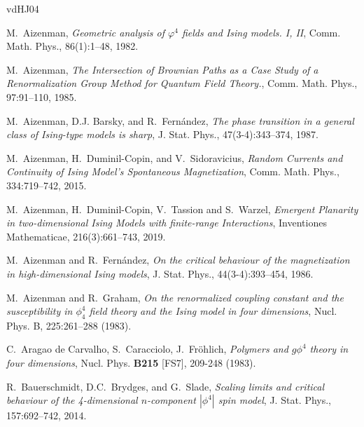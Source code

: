 \documentclass[a4paper,oneside,11pt]{article}
\numberwithin{equation}{section}
\numberwithin{equation}{section}
\numberwithin{equation}{section}
\begin{document}
\providecommand{\bysame}{\leavevmode\hbox to3em{\hrulefill}\thinspace}
\providecommand{\MR}{\relax\ifhmode\unskip\space\fi MR }
\providecommand{\MRhref}[2]{
  \href{http://www.ams.org/mathscinet-getitem?mr=#1}{#2}
}
\providecommand{\href}[2]{#2}
\begin{thebibliography}{vdHJ04}

M.~Aizenman, \emph{Geometric analysis of {$\varphi ^{4}$} fields and {I}sing
  models. {I}, {II}},   Comm. Math. Phys., 86(1):1--48, 1982.
    
  M.~Aizenman, \emph{The Intersection of Brownian Paths as a Case Study of a Renormalization Group Method for Quantum Field Theory.},   Comm. Math. Phys., 97:91--110, 1985. 
  
M.~Aizenman, D.J. Barsky, and R.~Fern{{\'a}}ndez, \emph{The phase
  \mbox{transition} in a general class of {I}sing-type models is sharp}, J.
  Stat. Phys., 47(3-4):343--374, 1987. 

M.~Aizenman, H.~{Duminil-Copin}, and V.~Sidoravicius, \emph{Random {C}urrents
  and {C}ontinuity of {I}sing {M}odel's {S}pontaneous {M}agnetization},
    Comm. Math. Phys., 334:719--742, 2015.

M.~Aizenman, H.~{Duminil-Copin}, V.~Tassion and S.~Warzel,
{\em Emergent Planarity in two-dimensional Ising Models with finite-range Interactions}, Inventiones Mathematicae, 216(3):661--743, 2019. 

M.~Aizenman and R.~Fern{{\'a}}ndez, \emph{On the critical behaviour of the
  magnetization in high-dimensional {I}sing models}, J. Stat. Phys.,
44(3-4):393--454, 1986. 


  M.~Aizenman and R.~Graham, \emph{On the renormalized coupling constant and the susceptibility in $\phi^4_4$ field theory and the Ising model in four dimensions}, Nucl. Phys. B, 225:261--288 (1983).

 C.~Aragao de Carvalho, S.~Caracciolo, J.~Fr\"ohlich, 
\emph{Polymers and $g\phi^4$ theory in four dimensions}, Nucl. Phys. {\bf B215} [FS7], 209-248 (1983). 

R.~Bauerschmidt, D.C.~Brydges, and G.~Slade, {\em Scaling limits and critical behaviour of the 4-dimensional $n$-component $|\phi^4|$ spin model}, J. Stat. Phys., 157:692--742, 2014.


\end{thebibliography}
\end{document}
